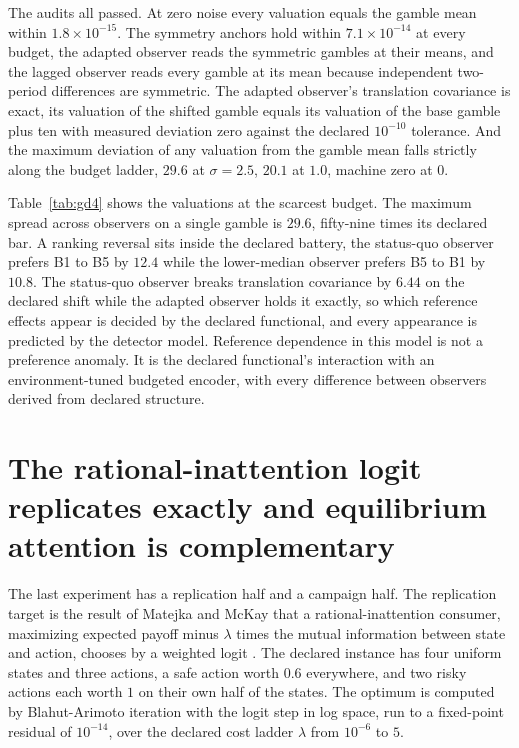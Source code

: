 \documentclass[aps,pre,reprint,nofootinbib]{revtex4-2}
\begin{document}
The audits all passed.  At zero noise every
valuation equals the gamble mean within $1.8\times10^{-15}$.  The
symmetry anchors hold within $7.1\times10^{-14}$ at every budget, the
adapted observer reads the symmetric gambles at their means, and the
lagged observer reads every gamble at its mean because independent
two-period differences are symmetric.  The adapted observer's
translation covariance is exact, its valuation of the shifted gamble
equals its valuation of the base gamble plus ten with measured
deviation zero against the declared $10^{-10}$ tolerance.  And the
maximum deviation of any valuation from the gamble mean falls
strictly along the budget ladder, $29.6$ at $\sigma = 2.5$, $20.1$ at
$1.0$, machine zero at $0$.

Table~\ref{tab:gd4} shows the valuations at the scarcest budget.
The maximum
spread across observers on a single gamble is $29.6$, fifty-nine
times its declared bar.  A ranking reversal sits inside the declared
battery, the status-quo observer prefers B1 to B5 by $12.4$ while the
lower-median observer prefers B5 to B1 by $10.8$.  The status-quo
observer breaks translation covariance by $6.44$ on the declared
shift while the adapted observer holds it exactly, so which
reference effects appear is decided by the declared functional, and
every appearance is predicted by the detector model.  Reference
dependence in this model is not a preference anomaly.  It is the
declared functional's interaction with an environment-tuned budgeted
encoder, with every difference between observers derived from
declared structure.

\section{The rational-inattention logit replicates exactly and
equilibrium attention is complementary}
\label{sec:gd5}

The last experiment has a replication half and a campaign half.  The
replication target is the result of Matejka and McKay that a
rational-inattention consumer, maximizing expected payoff minus
$\lambda$ times the mutual information between state and action,
chooses by a weighted logit \cite{Sims2003, MatejkaMcKay2015}.  The
declared instance has four uniform states and three actions, a safe
action worth $0.6$ everywhere, and two risky actions each worth $1$
on their own half of the states.  The optimum is computed by
Blahut-Arimoto iteration \cite{Blahut1972, Arimoto1972} with the
logit step in log space, run to a fixed-point residual of
$10^{-14}$, over the declared cost ladder $\lambda$ from $10^{-6}$
to $5$.
\end{document}
